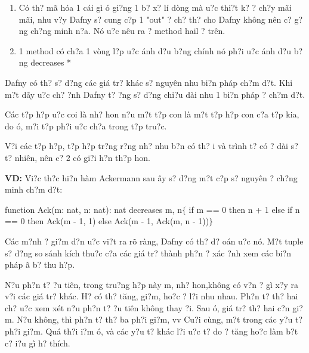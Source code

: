 \documentclass{article} %
\begin{document}
\begin{enumerate}
\item  C\'{o} th? m\~{a} h\'{o}a 1 c\'{a}i g\`{i} {\dj}\'{o} gi?ng 1 b? x? l\'{i} d\`{o}ng m\`{a} {\dj}u?c thi?t k? {\dj}? ch?y m\~{a}i m\~{a}i, nhu v?y Dafny s? cung c?p 1 "out" {\dj}? ch? th? cho Dafny kh\^{o}ng n\^{e}n c? g?ng ch?ng minh n?a. N\'{o} {\dj}u?c n\^{e}u ra ? method hail ? tr\^{e}n.

\item  1 method c\'{o} ch?a 1 v\`{o}ng l?p {\dj}u?c {\dj}\'{a}nh d?u b?ng ch\'{i}nh n\'{o} ph?i {\dj}u?c {\dj}\'{a}nh d?u b?ng decreases *
\end{enumerate}

\noindent Dafny c\'{o} th? s? d?ng c\'{a}c gi\'{a} tr? kh\'{a}c s? nguy\^{e}n nhu bi?n ph\'{a}p ch?m d?t. Khi m?t d\~{a}y {\dj}u?c ch? {\dj}?nh Dafny t? {\dj}?ng s? d?ng chi?u d\`{a}i nhu 1 bi?n ph\'{a}p {\dj}? ch?m d?t.

\noindent C\'{a}c t?p h?p {\dj}u?c coi l\`{a} nh? hon n?u m?t t?p con l\`{a} m?t t?p h?p con c?a t?p kia, do {\dj}\'{o}, m?i t?p ph?i {\dj}u?c ch?a trong t?p tru?c.

\noindent V?i c\'{a}c t?p h?p, t?p h?p tr?ng r?ng nh? nhu b?n c\'{o} th? {\dj}i v\`{a} tr\`{i}nh t? c\'{o} {\dj}? d\`{a}i s? t? nhi\^{e}n, n\^{e}n c? 2 c\'{o} gi?i h?n th?p hon. 

\noindent 

\noindent \textbf{VD:} Vi?c th?c hi?n h\`{a}m Ackermann sau {\dj}\^{a}y s? d?ng m?t c?p s? nguy\^{e}n {\dj}? ch?ng minh ch?m d?t:

\noindent function Ack(m: nat, n: nat): nat   decreases m, n$\{$   if m == 0 then n + 1   else if n == 0 then Ack(m - 1, 1)   else Ack(m - 1, Ack(m, n - 1))$\}$\textbf{}

C\'{a}c m?nh {\dj}? gi?m d?n {\dj}u?c vi?t ra r\~{o} r\`{a}ng, Dafny c\'{o} th? d? {\dj}o\'{a}n {\dj}u?c n\'{o}. M?t tuple s? d?ng so s\'{a}nh k\'{i}ch thu?c c?a c\'{a}c gi\'{a} tr? th\`{a}nh ph?n {\dj}? x\'{a}c {\dj}?nh xem c\'{a}c bi?n ph\'{a}p {\dj}\~{a} b? thu h?p. 

N?u ph?n t? {\dj}?u ti\^{e}n, trong tru?ng h?p n\`{a}y m, nh? hon,kh\^{o}ng c\'{o} v?n {\dj}? g\`{i} x?y ra v?i c\'{a}c gi\'{a} tr? kh\'{a}c. H? c\'{o} th? t\u{a}ng, gi?m, ho?c ? l?i nhu nhau. Ph?n t? th? hai ch? {\dj}u?c xem x\'{e}t n?u ph?n t? {\dj}?u ti\^{e}n kh\^{o}ng thay {\dj}?i. Sau {\dj}\'{o}, gi\'{a} tr? th? hai c?n gi?m. N?u kh\^{o}ng, th\`{i} ph?n t? th? ba ph?i gi?m, vv Cu?i c\`{u}ng, m?t trong c\'{a}c y?u t? ph?i gi?m. Qu\'{a} th?i {\dj}i?m {\dj}\'{o}, v\`{a} c\'{a}c y?u t? kh\'{a}c l?i {\dj}u?c t? do {\dj}? t\u{a}ng ho?c l\`{a}m b?t c? {\dj}i?u g\`{i} h? th\'{i}ch.\textbf{}
\end{document}
